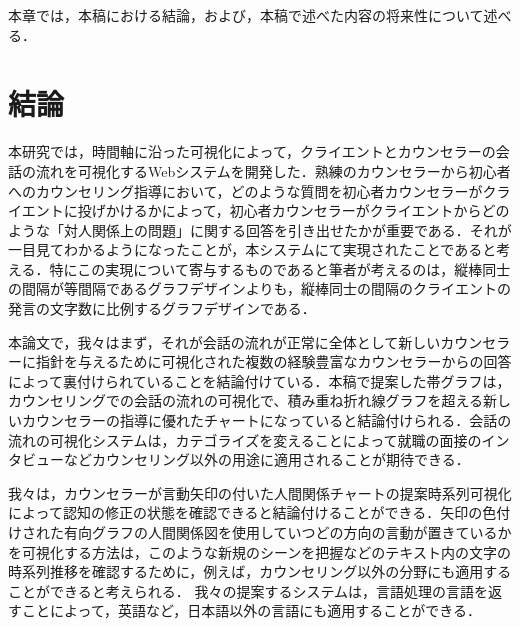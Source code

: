 \documentclass[shuuron]{kuee}
\begin{document}
本章では，本稿における結論，および，本稿で述べた内容の将来性について述べる．

\section{結論}

本研究では，時間軸に沿った可視化によって，クライエントとカウンセラーの会話の流れを可視化するWebシステムを開発した．熟練のカウンセラーから初心者へのカウンセリング指導において，どのような質問を初心者カウンセラーがクライエントに投げかけるかによって，初心者カウンセラーがクライエントからどのような「対人関係上の問題」に関する回答を引き出せたかが重要である．それが一目見てわかるようになったことが，本システムにて実現されたことであると考える．特にこの実現について寄与するものであると筆者が考えるのは，縦棒同士の間隔が等間隔であるグラフデザインよりも，縦棒同士の間隔のクライエントの発言の文字数に比例するグラフデザインである．




本論文で，我々はまず，それが会話の流れが正常に全体として新しいカウンセラーに指針を与えるために可視化された複数の経験豊富なカウンセラーからの回答によって裏付けられていることを結論付けている．本稿で提案した帯グラフは，カウンセリングでの会話の流れの可視化で、積み重ね折れ線グラフを超える新しいカウンセラーの指導に優れたチャートになっていると結論付けられる．会話の流れの可視化システムは，カテゴライズを変えることによって就職の面接のインタビューなどカウンセリング以外の用途に適用されることが期待できる．


我々は，カウンセラーが言動矢印の付いた人間関係チャートの提案時系列可視化によって認知の修正の状態を確認できると結論付けることができる．矢印の色付けされた有向グラフの人間関係図を使用していつどの方向の言動が置きているかを可視化する方法は，このような新規のシーンを把握などのテキスト内の文字の時系列推移を確認するために，例えば，カウンセリング以外の分野にも適用することができると考えられる．
我々の提案するシステムは，言語処理の言語を返すことによって，英語など，日本語以外の言語にも適用することができる．
\end{document}
